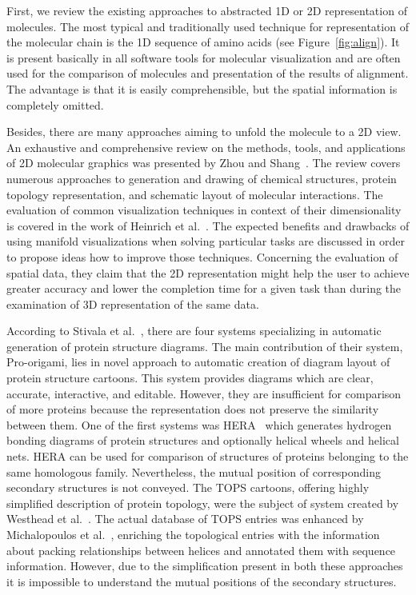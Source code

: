 \documentclass[twocolumn]{bmcart}%
\begin{document}
First, we review the existing approaches to abstracted 1D or 2D representation of molecules.
The most typical and traditionally used technique for representation of the molecular chain is the 1D sequence of amino acids (see Figure~\ref{fig:align}).
It is present basically in all software tools for molecular visualization and are often used for the comparison of molecules and presentation of the results of alignment.
The advantage is that it is easily comprehensible, but the spatial information is completely omitted.

Besides, there are many approaches aiming to unfold the molecule to a 2D view.
An exhaustive and comprehensive review on the methods, tools, and applications of 2D molecular graphics was presented by Zhou and Shang~\cite{Zhou2009}. 
The review covers numerous approaches to generation and drawing of chemical structures, protein topology representation, and schematic layout of molecular interactions.
The evaluation of common visualization techniques in context of their dimensionality is covered in the work of Heinrich et al.~\cite{Heinrich2014}.
The expected benefits and drawbacks of using manifold visualizations when solving particular tasks are discussed in order to propose ideas how to improve those techniques.
Concerning the evaluation of spatial data, they claim that the 2D representation might help the user to achieve greater accuracy and lower the completion time for a given task than during the examination of 3D representation of the same data.

According to Stivala et al.~\cite{Stivala2011}, there are four systems specializing in automatic generation of protein structure diagrams.
The main contribution of their system, Pro-origami, lies in novel approach to automatic creation of diagram layout of protein structure cartoons.
This system provides diagrams which are clear, accurate, interactive, and editable.
However, they are insufficient for comparison of more proteins because the representation does not preserve the similarity between them.
One of the first systems was HERA~\cite{Hutchinson1990} which generates hydrogen bonding diagrams of protein structures and optionally helical wheels and helical nets.
HERA can be used for comparison of structures of proteins belonging to the same homologous family. 
Nevertheless, the mutual position of corresponding secondary structures is not conveyed.
The TOPS cartoons, offering highly simplified description of protein topology, were the subject of system created by Westhead et al.~\cite{Westhead1999}.
The actual database of TOPS entries was enhanced by Michalopoulos et al.~\cite{Michalopoulos2004}, enriching the topological entries with the information about packing relationships between helices and annotated them with sequence information.
However, due to the simplification present in both these approaches it is impossible to understand the mutual positions of the secondary structures.
\end{document}
